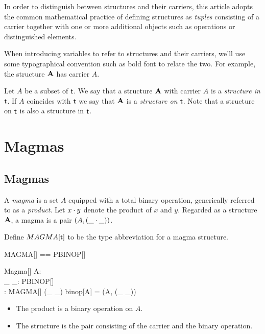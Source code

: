 \documentclass{amsart}
\begin{document}
In order to distinguish between structures and their carriers, 
this article adopts the common mathematical practice of defining structures as \textit{tuples}
consisting of a carrier together with one or more additional objects such as operations or
distinguished elements.

When introducing variables to refer to structures and their carriers,
we'll use some typographical convention such as bold font to relate the two.
For example, the structure $\mathbf{A}$ has carrier $A$.

Let $A$ be a subset of $\mathsf{t}$.
We say that a structure $\mathbf{A}$ with carrier $A$ is a \textit{structure in} $\mathsf{t}$.
If $A$ coincides with $\mathsf{t}$ we say that $\mathbf{A}$ is a \textit{structure on} $\mathsf{t}$.
Note that a structure on $\mathsf{t}$ is also a structure in $\mathsf{t}$.

\section{Magmas}

\subsection{Magmas}

A \textit{magma} is a set $A$ equipped with a total binary operation, 
generically referred to as a \textit{product}.
Let $x \mathbin{\cdot} y$ denote the product of $x$ and $y$.
Regarded as a structure $\mathbf{A}$, a magma is a pair $(A, (\_ \mathbin{\cdot} \_))$.

Define $MAGMA[\mathsf{t}]$ to be the type abbreviation for a magma structure.

\begin{zed}
	MAGMA[\genT] == \power \genT \cross PBINOP[\genT]
\end{zed}


\begin{schema}{Magma}[\genT]
	A: \power \genT \\
	\_ \opG \_: PBINOP[\genT] \\
	\strucA: MAGMA[\genT]
\where
	(\_ \opG \_) \in binop[A]
\also
	\strucA = (A, (\_ \opG \_))
\end{schema}

\begin{itemize}
	\item The product is a binary operation on $A$.
	\item The structure is the pair consisting of the carrier and the binary operation.
\end{itemize}
\end{document}
